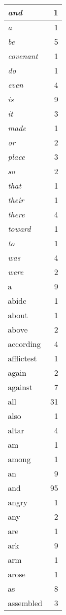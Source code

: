 \begin{center}
\begin{longtable}{l|r}
\emph{and} & 1 \\ \hline
\emph{a} & 1 \\ \hline
\emph{be} & 5 \\ \hline
\emph{covenant} & 1 \\ \hline
\emph{do} & 1 \\ \hline
\emph{even} & 4 \\ \hline
\emph{is} & 9 \\ \hline
\emph{it} & 3 \\ \hline
\emph{made} & 1 \\ \hline
\emph{or} & 2 \\ \hline
\emph{place} & 3 \\ \hline
\emph{so} & 2 \\ \hline
\emph{that} & 1 \\ \hline
\emph{their} & 1 \\ \hline
\emph{there} & 4 \\ \hline
\emph{toward} & 1 \\ \hline
\emph{to} & 1 \\ \hline
\emph{was} & 4 \\ \hline
\emph{were} & 2 \\ \hline
a & 9 \\ \hline
abide & 1 \\ \hline
about & 1 \\ \hline
above & 2 \\ \hline
according & 4 \\ \hline
afflictest & 1 \\ \hline
again & 2 \\ \hline
against & 7 \\ \hline
all & 31 \\ \hline
also & 1 \\ \hline
altar & 4 \\ \hline
am & 1 \\ \hline
among & 1 \\ \hline
an & 9 \\ \hline
and & 95 \\ \hline
angry & 1 \\ \hline
any & 2 \\ \hline
are & 1 \\ \hline
ark & 9 \\ \hline
arm & 1 \\ \hline
arose & 1 \\ \hline
as & 8 \\ \hline
assembled & 3 \\ \hline

\end{longtable}
\end{center}
